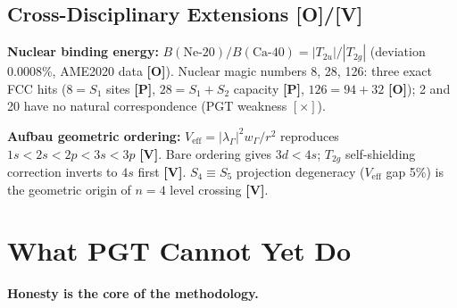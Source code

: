 \documentclass[11pt,a4paper]{article}
\newcommand{\gradeP}{\textbf{[P]}}
\newcommand{\gradeV}{\textbf{[V]}}
\newcommand{\gradeO}{\textbf{[O]}}
\begin{document}
\subsection{Cross-Disciplinary Extensions \gradeO/\gradeV}
\textbf{Nuclear binding energy:} $B(\mathrm{Ne\text{-}20})/B(\mathrm{Ca\text{-}40}) = |T_{2u}|/|T_{2g}|$ (deviation $0.0008\%$, AME2020 data \gradeO). Nuclear magic numbers 8, 28, 126: three exact FCC hits ($8 = S_1$ sites \gradeP, $28 = S_1{+}S_2$ capacity \gradeP, $126 = 94{+}32$ \gradeO); 2 and 20 have no natural correspondence (PGT weakness $[\times]$).

\textbf{Aufbau geometric ordering:} $V_{\mathrm{eff}} = |\lambda_\Gamma|^2 w_\Gamma/r^2$ reproduces $1s < 2s < 2p < 3s < 3p$ \gradeV. Bare ordering gives $3d < 4s$; $T_{2g}$ self-shielding correction inverts to $4s$ first \gradeV. $S_4\equiv S_5$ projection degeneracy ($V_{\mathrm{eff}}$ gap 5\%) is the geometric origin of $n{=}4$ level crossing \gradeV.

\section{What PGT Cannot Yet Do}\label{sec:gaps}

\textbf{Honesty is the core of the methodology.}
\end{document}
